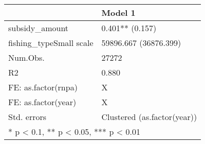 \begin{table}[H]
\centering
\begin{tabular}[t]{ll}
\toprule
  & Model 1\\
\midrule
subsidy\_amount & 0.401** (0.157)\\
fishing\_typeSmall scale & 59896.667 (36876.399)\\
\midrule
Num.Obs. & 27272\\
R2 & 0.880\\
FE: as.factor(rnpa) & X\\
FE: as.factor(year) & X\\
Std. errors & Clustered (as.factor(year))\\
\bottomrule
\multicolumn{2}{l}{\textsuperscript{} * p < 0.1, ** p < 0.05, *** p < 0.01}\\
\end{tabular}
\end{table}
